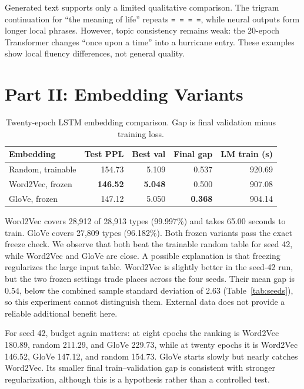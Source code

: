 \documentclass[11pt,a4paper]{article}
\begin{document}
Generated text supports only a limited qualitative comparison. The trigram continuation for
``the meaning of life'' repeats \texttt{= = = =}, while neural outputs form longer local phrases.
However, topic consistency remains weak: the 20-epoch Transformer changes ``once upon a time''
into a hurricane entry. These examples show local fluency differences, not general quality.

\section{Part II: Embedding Variants}
\begin{table}[t]
\centering
\small
\caption{Twenty-epoch LSTM embedding comparison. Gap is final validation minus training loss.}
\begin{tabular}{lrrrr}
\toprule
Embedding & Test PPL & Best val & Final gap & LM train (s) \\
\midrule
Random, trainable & 154.73 & 5.109 & 0.537 & 920.69 \\
Word2Vec, frozen & \textbf{146.52} & \textbf{5.048} & 0.500 & 907.08 \\
GloVe, frozen & 147.12 & 5.050 & \textbf{0.368} & 904.14 \\
\bottomrule
\end{tabular}
\label{tab:part2}
\end{table}

Word2Vec covers 28,912 of 28,913 types (99.997\%) and takes 65.00 seconds to train. GloVe covers
27,809 types (96.182\%). Both frozen variants pass the exact freeze check. We observe that both
beat the trainable random table for seed 42, while Word2Vec and GloVe are close. A possible
explanation is that freezing regularizes the large input table. Word2Vec is slightly better in
the seed-42 run, but the two frozen settings trade places across the four seeds. Their mean
gap is 0.54, below the combined sample standard deviation of 2.63 (Table~\ref{tab:seeds}), so
this experiment cannot distinguish them. External data does not provide a reliable additional benefit here.

For seed 42, budget again matters: at eight epochs the ranking is Word2Vec 180.89, random 211.29, and GloVe
229.73, while at twenty epochs it is Word2Vec 146.52, GloVe 147.12, and random 154.73. GloVe
starts slowly but nearly catches Word2Vec. Its smaller final train--validation gap is consistent
with stronger regularization, although this is a hypothesis rather than a controlled test.
\end{document}
